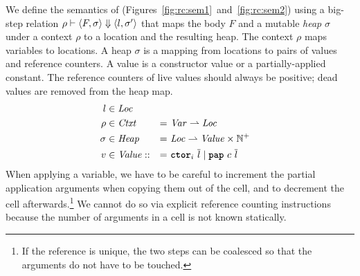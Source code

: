 \documentclass[sigconf]{acmart}
\begin{document}
We define the semantics of \rcIR{} (Figures~\ref{fig:rc:sem1}~and~\ref{fig:rc:sem2}) using a
big-step relation $\rho \vdash \langle F, \sigma \rangle \Downarrow \langle l, \sigma' \rangle$ that maps the
body $F$ and a mutable \emph{heap} $\sigma$ under a context $\rho$ to
a location and the resulting heap. The context $\rho$ maps
variables to locations. A heap $\sigma$ is a mapping from locations to
pairs of values and reference counters.
A value is a constructor value
or a partially-applied constant.
The reference counters of live values should always be positive; dead values
are removed from the heap map.
\begin{alignat*}{3}
  l &\in \ty{Loc}\\
  \rho &\in \ty{Ctxt} &=&\ \ty{Var} \rightharpoonup \ty{Loc}\\
  \sigma &\in \ty{Heap} &=&\ \ty{Loc} \rightharpoonup \ty{Value} \times \mathbb{N}^+\\
  v \syncat{Value} ::&=&\ \kw{ctor}_i\ \many{l} \mid \kw{pap}\ c\ \many{l}
\end{alignat*}
When applying a variable, we have to be careful to increment the
partial application arguments when copying them out of the  cell, and to
decrement the cell afterwards.\footnote{If the  reference is unique, the
two steps can be coalesced so that the arguments do not have to be touched.}
We cannot do so via explicit reference counting instructions because the number of
arguments in a  cell is not known statically.
\end{document}
